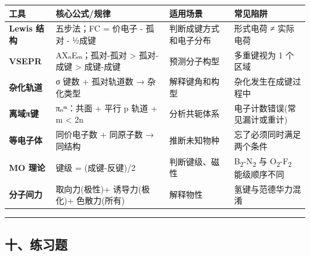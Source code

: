 {\def\LTcaptype{none} %
\begin{longtable}[]{@{}
  >{\raggedright\arraybackslash}p{}
  >{\raggedright\arraybackslash}p{}
  >{\raggedright\arraybackslash}p{}
  >{\raggedright\arraybackslash}p{}@{}}
\toprule\noalign{}
\begin{minipage}[b]{\linewidth}\raggedright
工具
\end{minipage} & \begin{minipage}[b]{\linewidth}\raggedright
核心公式/规律
\end{minipage} & \begin{minipage}[b]{\linewidth}\raggedright
适用场景
\end{minipage} & \begin{minipage}[b]{\linewidth}\raggedright
常见陷阱
\end{minipage} \\
\midrule\noalign{}
\endhead
\bottomrule\noalign{}
\endlastfoot
\textbf{Lewis 结构} & 五步法；FC = 价电子 - 孤对 - ½成键 & 判断成键方式和电子分布 & 形式电荷 ≠ 实际电荷 \\
\textbf{VSEPR} & AXₙEₘ；孤对-孤对 \textgreater{} 孤对-成键 \textgreater{} 成键-成键 & 预测分子构型 & 多重键视为 1 个区域 \\
\textbf{杂化轨道} & σ 键数 + 孤对轨道数 → 杂化类型 & 解释键角和构型 & 杂化发生在成键过程中 \\
\textbf{离域π键} & πₙᵐ：共面 + 平行 p 轨道 + m \textless{} 2n & 分析共轭体系 & 电子计数错误(常见漏计或重计) \\
\textbf{等电子体} & 同价电子数 + 同原子数 → 同结构 & 推断未知物种 & 忘了必须同时满足两个条件 \\
\textbf{MO 理论} & 键级 = (成键-反键)/2 & 判断键级、磁性 & B\textsubscript{2}-N\textsubscript{2} 与 O\textsubscript{2}-F\textsubscript{2} 能级顺序不同 \\
\textbf{分子间力} & 取向力(极性)+ 诱导力(极化)+ 色散力(所有) & 解释物性 & 氢键与范德华力混淆 \\
\end{longtable}
}

\begin{center}\rule{0.5\linewidth}{0.5pt}\end{center}

\subsection{十、练习题}\label{ux5341ux7ec3ux4e60ux9898}

